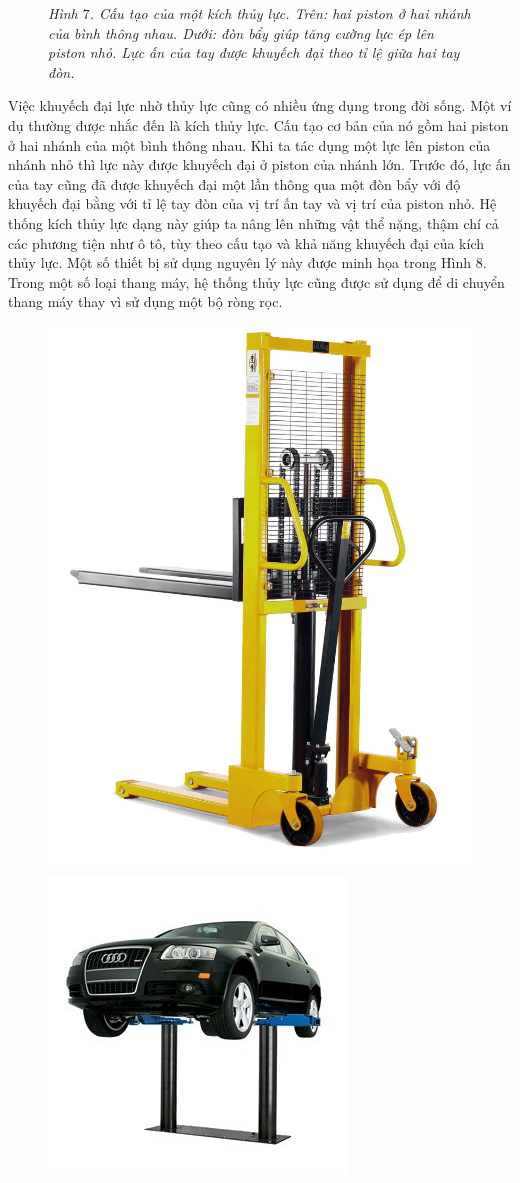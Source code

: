 \begin{multicols}{2}
\begin{figure}[H]
		\caption{\small\textit{\color{timhieukhoahoc}Hình $7$. Cấu tạo của một kích thủy lực. Trên: hai piston ở hai nhánh của bình thông nhau. Dưới: đòn bẩy giúp tăng cường lực ép lên piston nhỏ. Lực ấn của tay được khuyếch đại theo tỉ lệ giữa hai tay đòn.}}
		\vspace*{-10pt}
	\end{figure}
	Việc khuyếch đại lực nhờ thủy lực cũng có nhiều ứng dụng trong đời sống. Một ví dụ thường được nhắc đến là kích thủy lực. Cấu tạo cơ bản của nó gồm hai piston ở hai nhánh của một bình thông nhau. Khi ta tác dụng một lực lên piston của nhánh nhỏ thì lực này được khuyếch đại ở piston của nhánh lớn. Trước đó, lực ấn của tay cũng đã được khuyếch đại một lần thông qua một đòn bẩy với độ khuyếch đại bằng với tỉ lệ tay đòn của vị trí ấn tay và vị trí của piston nhỏ. Hệ thống kích thủy lực dạng này giúp ta nâng lên những vật thể nặng, thậm chí cả các phương tiện như ô tô, tùy theo cấu tạo và khả năng khuyếch đại của kích thủy lực. Một số thiết bị sử dụng nguyên lý này được minh họa trong Hình $8$. Trong một số loại thang máy, hệ thống thủy lực cũng được sử dụng để di chuyển thang máy thay vì sử dụng một bộ ròng rọc.
	\begin{figure}[H]
		\vspace*{-5pt}
		\centering
		\captionsetup{labelformat= empty, justification=centering}
		\includegraphics[height= 0.55\linewidth]{15}
		\includegraphics[height= 0.55\linewidth]{16}

\end{figure}
\end{multicols}
